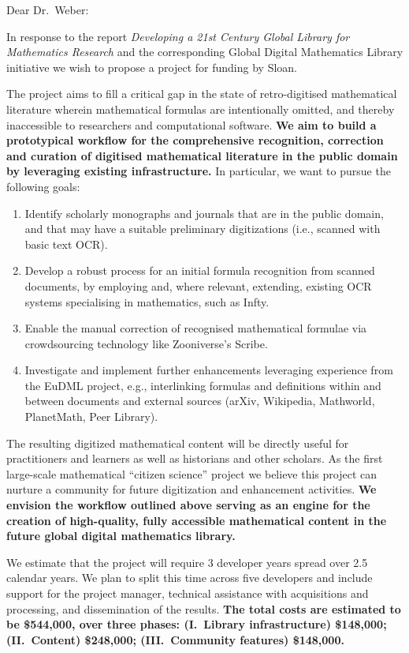 \documentclass[10pt]{article}
\begin{document}
\thispagestyle{empty}

Dear Dr.~Weber:

In response to the report \emph{Developing a 21st Century Global Library
for Mathematics Research} and the corresponding Global Digital
Mathematics Library initiative we wish to propose a project 
for funding by Sloan.

The project aims to fill a critical gap
in the state of retro-digitised mathematical literature
wherein mathematical formulas are intentionally omitted, 
and thereby inaccessible to researchers and computational software.
\textbf{We aim to build a prototypical workflow for the comprehensive 
recognition, correction
and curation of digitised mathematical literature in the public domain 
by leveraging existing infrastructure.} In particular, we want to pursue 
the following goals:
\begin{enumerate}
\item Identify scholarly monographs and journals that are in the
  public domain, and that may have a suitable preliminary
  digitizations (i.e., scanned with basic text OCR).
\item Develop a robust process for an initial formula recognition from scanned 
documents, by employing and, where relevant, extending, existing OCR systems 
specialising in mathematics, such as {\sf Infty}.
\item Enable 
the manual correction of recognised mathematical formulae via crowdsourcing 
technology like Zooniverse's {\sf Scribe}.
\item Investigate and implement further enhancements leveraging
experience from the EuDML project, e.g., 
interlinking formulas and definitions within and between documents and
external sources  (arXiv, Wikipedia, Mathworld, PlanetMath, Peer 
Library).
\end{enumerate}
The resulting digitized mathematical content will be directly useful
for practitioners and learners as well as historians and other
scholars. As the first large-scale mathematical ``citizen science''
project we believe this project can nurture a community for future
digitization and enhancement activities.  \textbf{We envision the
  workflow outlined above serving as an engine for the creation of
  high-quality, fully accessible mathematical content in the future
  global digital mathematics library.}

We estimate that the project will require 3 developer years spread over 2.5
calendar years.  We plan to split this time across five developers and
include support for the project manager, technical assistance with
acquisitions and processing, and dissemination of the results.
\textbf{The total costs are estimated to be \$544,000, over three phases:
(I.~Library infrastructure) \$148,000;
(II.~Content)               \$248,000;
(III.~Community features)   \$148,000.}
\end{document}
